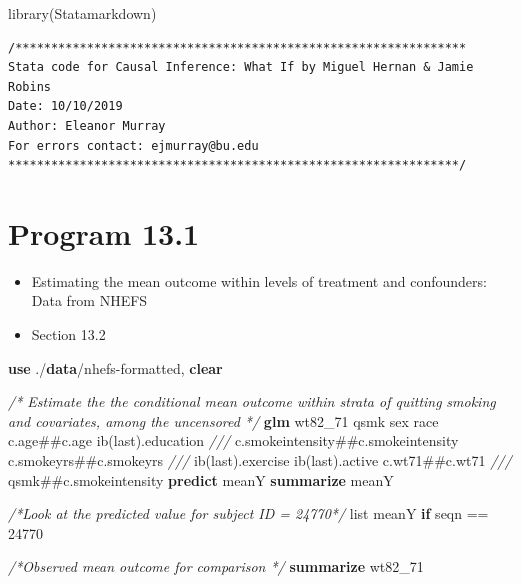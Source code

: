 \documentclass[
  10pt,
]{book}
\newenvironment{Shaded}{\begin{snugshade}}{\end{snugshade}}
\newcommand{\CommentTok}[1]{\textcolor[rgb]{0.56,0.35,0.01}{\textit{#1}}}
\newcommand{\FunctionTok}[1]{\textcolor[rgb]{0.00,0.00,0.00}{#1}}
\newcommand{\KeywordTok}[1]{\textcolor[rgb]{0.13,0.29,0.53}{\textbf{#1}}}
\newcommand{\NormalTok}[1]{#1}
\newcommand{\OtherTok}[1]{\textcolor[rgb]{0.56,0.35,0.01}{#1}}
\providecommand{\tightlist}{%
  \setlength{\itemsep}{0pt}\setlength{\parskip}{0pt}}
\begin{document}
\begin{Shaded}
\begin{Highlighting}[]
\FunctionTok{library}\NormalTok{(Statamarkdown)}
\end{Highlighting}
\end{Shaded}

\begin{verbatim}
/***************************************************************
Stata code for Causal Inference: What If by Miguel Hernan & Jamie Robins
Date: 10/10/2019
Author: Eleanor Murray 
For errors contact: ejmurray@bu.edu
***************************************************************/
\end{verbatim}

\hypertarget{program-13.1-1}{%
\section{Program 13.1}\label{program-13.1-1}}

\begin{itemize}
\tightlist
\item
  Estimating the mean outcome within levels of treatment and confounders: Data from NHEFS
\item
  Section 13.2
\end{itemize}

\begin{Shaded}
\begin{Highlighting}[]
\KeywordTok{use}\NormalTok{ ./}\KeywordTok{data}\NormalTok{/nhefs{-}formatted, }\KeywordTok{clear}

\CommentTok{/* Estimate the the conditional mean outcome within strata of quitting }
\CommentTok{smoking and covariates, among the uncensored */}
\KeywordTok{glm}\NormalTok{ wt82\_71 qsmk sex race c.age\#\#c.age ib(}\FunctionTok{last}\NormalTok{).education }\CommentTok{///}
\NormalTok{  c.smokeintensity\#\#c.smokeintensity c.smokeyrs\#\#c.smokeyrs }\CommentTok{///}
\NormalTok{  ib(}\FunctionTok{last}\NormalTok{).exercise ib(}\FunctionTok{last}\NormalTok{).active c.wt71\#\#c.wt71 }\CommentTok{///}
\NormalTok{  qsmk\#\#c.smokeintensity}
\KeywordTok{predict}\NormalTok{ meanY}
\KeywordTok{summarize}\NormalTok{ meanY}

\CommentTok{/*Look at the predicted value for subject ID = 24770*/}
\OtherTok{list}\NormalTok{ meanY }\KeywordTok{if}\NormalTok{ seqn == 24770}

\CommentTok{/*Observed mean outcome for comparison */}
\KeywordTok{summarize}\NormalTok{ wt82\_71}
\end{Highlighting}
\end{Shaded}
\end{document}
